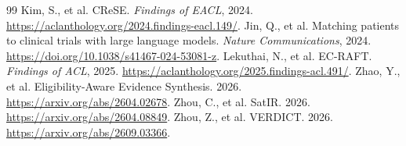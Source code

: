 \documentclass[10pt]{article}
\begin{document}
\begin{thebibliography}{99}
 Kim, S., et al. CReSE. \emph{Findings of EACL}, 2024. \url{https://aclanthology.org/2024.findings-eacl.149/}.
 Jin, Q., et al. Matching patients to clinical trials with large language models. \emph{Nature Communications}, 2024. \url{https://doi.org/10.1038/s41467-024-53081-z}.
 Lekuthai, N., et al. EC-RAFT. \emph{Findings of ACL}, 2025. \url{https://aclanthology.org/2025.findings-acl.491/}.
 Zhao, Y., et al. Eligibility-Aware Evidence Synthesis. 2026. \url{https://arxiv.org/abs/2604.02678}.
 Zhou, C., et al. SatIR. 2026. \url{https://arxiv.org/abs/2604.08849}.
 Zhou, Z., et al. VERDICT. 2026. \url{https://arxiv.org/abs/2609.03366}.
\end{thebibliography}
\end{document}
